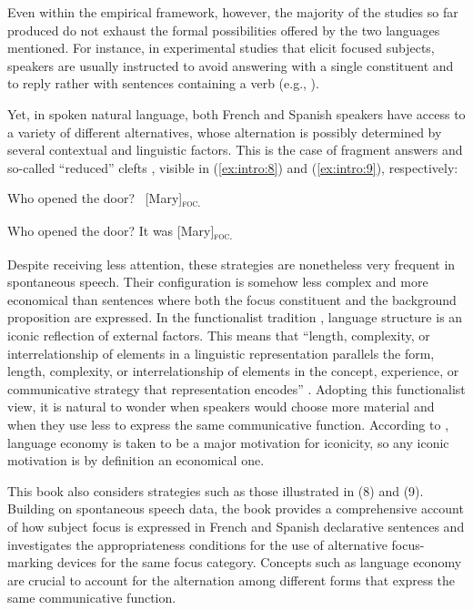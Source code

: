 Even within the empirical framework, however, the majority of the studies so far produced do not exhaust the formal possibilities offered by the two languages mentioned. For instance, in experimental studies that elicit focused subjects, speakers are usually instructed to avoid answering with a single constituent and to reply rather with sentences containing a verb (e.g., \cite{skopeteas2010focus}).

Yet, in spoken natural language, both French and Spanish speakers have access to a variety of different alternatives, whose alternation is possibly determined by several contextual and linguistic factors. This is the case of fragment answers \parencite{merchant2005fragments} and so-called ``reduced” clefts \parencite{belletti2008answering, doetjes2004cleft, hedberg2000referential, buring1998identity, mikkelsen2012so}, visible in (\ref{ex:intro:8}) and (\ref{ex:intro:9}), respectively:

\ea \label{ex:intro:8}
\ea Who opened the door? 
\ex \ [Mary]\textsubscript{\textsc{foc.}}\normalsize
\z \z

\ea \label{ex:intro:9}
\ea Who opened the door? 
\ex It was [Mary]\textsubscript{\textsc{foc.}}\normalsize
\z \z


Despite receiving less attention, these strategies are nonetheless very frequent in spontaneous speech. Their configuration is somehow less complex and more economical than sentences where both the focus constituent and the background proposition are expressed. In the functionalist tradition \parencite{Givon1985, Givon1995, Haiman1985, macwhinney1989functionalism}, language structure is an iconic reflection of external factors. This means that ``length, complexity, or interrelationship of elements in a linguistic representation parallels the form, length, complexity, or interrelationship of elements in the concept, experience, or communicative strategy that representation encodes” \parencite[756]{newmeyer1992iconicity}. Adopting this functionalist view, it is natural to wonder when speakers would choose more material and when they use less to express the same communicative function.  According to \textcite{Givon1985}, language economy is taken to be a major motivation for iconicity, so any iconic motivation is by definition an economical one.

This book also considers strategies such as those illustrated in (8) and (9). Building on spontaneous speech data, the book provides a comprehensive account of how subject focus is expressed in French and Spanish declarative sentences and investigates the appropriateness conditions for the use of alternative focus-marking devices for the same focus category. Concepts such as language economy are crucial to account for the alternation among different forms that express the same communicative function.

